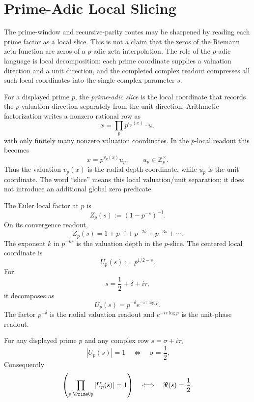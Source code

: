 \section{Prime-Adic Local Slicing}
\label{sec:unified-reality-prime-adic-local-slicing}

The prime-window and recursive-parity routes may be sharpened by reading
each prime factor as a local slice.  This is not a claim that the zeros of
the Riemann zeta function are zeros of a $p$-adic zeta interpolation.
The role of the $p$-adic language is local decomposition: each prime
coordinate supplies a valuation direction and a unit direction, and the
completed complex readout compresses all such local coordinates into the
single complex parameter $s$.

\begin{definition}
\label{def:unified-reality-prime-adic-slice}
For a displayed prime $p$, the \emph{prime-adic slice} is the local
coordinate that records the $p$-valuation direction separately from the
unit direction.  Arithmetic factorization writes a nonzero rational row as
$$
x=\prod_{p}p^{v_p(x)}\cdot u,
$$
with only finitely many nonzero valuation coordinates.  In the $p$-local
readout this becomes
$$
x=p^{v_p(x)}u_p,
\qquad
u_p\in\mathbb Z_p^{\times}.
$$
Thus the valuation $v_p(x)$ is the radial depth coordinate, while
$u_p$ is the unit coordinate.  The word ``slice'' means this local
valuation/unit separation; it does not introduce an additional global
zero predicate.
\end{definition}

\begin{definition}
\label{def:unified-reality-prime-adic-euler-local-coordinate}
The Euler local factor at $p$ is
$$
Z_p(s):=(1-p^{-s})^{-1}.
$$
On its convergence readout,
$$
Z_p(s)=1+p^{-s}+p^{-2s}+p^{-3s}+\cdots.
$$
The exponent $k$ in $p^{-ks}$ is the valuation depth in the $p$-slice.
The centered local coordinate is
$$
U_p(s):=p^{1/2-s}.
$$
For
$$
s=\frac12+\delta+i\tau,
$$
it decomposes as
$$
U_p(s)=p^{-\delta}e^{-i\tau\log p}.
$$
The factor $p^{-\delta}$ is the radial valuation readout and
$e^{-i\tau\log p}$ is the unit-phase readout.
\end{definition}

\begin{theorem}
\label{thm:unified-reality-prime-adic-unit-surface-fixed-half}
For any displayed prime $p$ and any complex row $s=\sigma+i\tau$,
$$
|U_p(s)|=1
\quad\Longleftrightarrow\quad
\sigma=\frac12.
$$
Consequently
$$
\left(\prod_{p:\PrimeUp}|U_p(s)|=1\right)
\quad\Longleftrightarrow\quad
\Re(s)=\frac12.
$$
\end{theorem}

